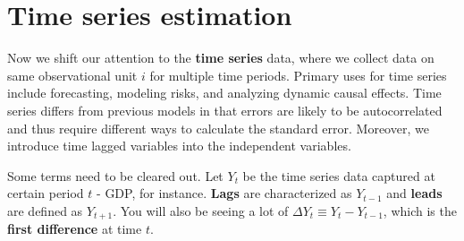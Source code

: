 \chapter{Time series estimation}
Now we shift our attention to the \textbf{time series} data, where we collect data on same observational unit $i$ for multiple time periods. Primary uses for time series include forecasting, modeling risks, and analyzing dynamic causal effects. Time series differs from previous models in that errors are likely to be autocorrelated and thus require different ways to calculate the standard error. Moreover, we introduce time lagged variables into the independent variables.
\par\medskip
Some terms need to be cleared out. Let $Y_t$ be the time series data captured at certain period $t$ - GDP, for instance. \textbf{Lags} are characterized as $Y_{t-1}$ and \textbf{leads} are defined as $Y_{t+1}$. You will also be seeing a lot of $\Delta Y_{t}\equiv Y_t-Y_{t-1}$, which is the \textbf{first difference} at time $t$. 
\par\medskip
